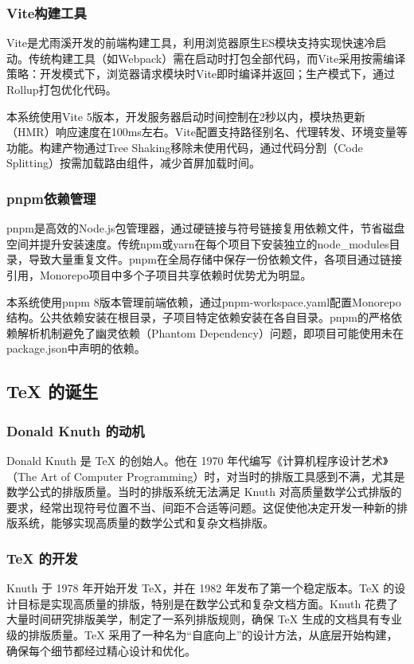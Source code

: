 \documentclass[UTF8,AutoFakeBold=1,AutoFakeSlant,zihao=-4]{SCAU}
\begin{document}
\subsubsection{Vite构建工具}

Vite是尤雨溪开发的前端构建工具，利用浏览器原生ES模块支持实现快速冷启动。传统构建工具（如Webpack）需在启动时打包全部代码，而Vite采用按需编译策略：开发模式下，浏览器请求模块时Vite即时编译并返回；生产模式下，通过Rollup打包优化代码。

本系统使用Vite 5版本，开发服务器启动时间控制在2秒以内，模块热更新（HMR）响应速度在100ms左右。Vite配置支持路径别名、代理转发、环境变量等功能。构建产物通过Tree Shaking移除未使用代码，通过代码分割（Code Splitting）按需加载路由组件，减少首屏加载时间。

\subsubsection{pnpm依赖管理}

pnpm是高效的Node.js包管理器，通过硬链接与符号链接复用依赖文件，节省磁盘空间并提升安装速度。传统npm或yarn在每个项目下安装独立的node\_modules目录，导致大量重复文件。pnpm在全局存储中保存一份依赖文件，各项目通过链接引用，Monorepo项目中多个子项目共享依赖时优势尤为明显。

本系统使用pnpm 8版本管理前端依赖，通过pnpm-workspace.yaml配置Monorepo结构。公共依赖安装在根目录，子项目特定依赖安装在各自目录。pnpm的严格依赖解析机制避免了幽灵依赖（Phantom Dependency）问题，即项目可能使用未在package.json中声明的依赖。

\subsection{TeX 的诞生}
\subsubsection{Donald Knuth 的动机}
Donald Knuth 是 TeX 的创始人。他在 1970 年代编写《计算机程序设计艺术》（The Art of Computer Programming）时，对当时的排版工具感到不满，尤其是数学公式的排版质量。当时的排版系统无法满足 Knuth 对高质量数学公式排版的要求，经常出现符号位置不当、间距不合适等问题。这促使他决定开发一种新的排版系统，能够实现高质量的数学公式和复杂文档排版。

\subsubsection{TeX 的开发}
Knuth 于 1978 年开始开发 TeX，并在 1982 年发布了第一个稳定版本。TeX 的设计目标是实现高质量的排版，特别是在数学公式和复杂文档方面。Knuth 花费了大量时间研究排版美学，制定了一系列排版规则，确保 TeX 生成的文档具有专业级的排版质量。TeX 采用了一种名为“自底向上”的设计方法，从底层开始构建，确保每个细节都经过精心设计和优化。
\end{document}
